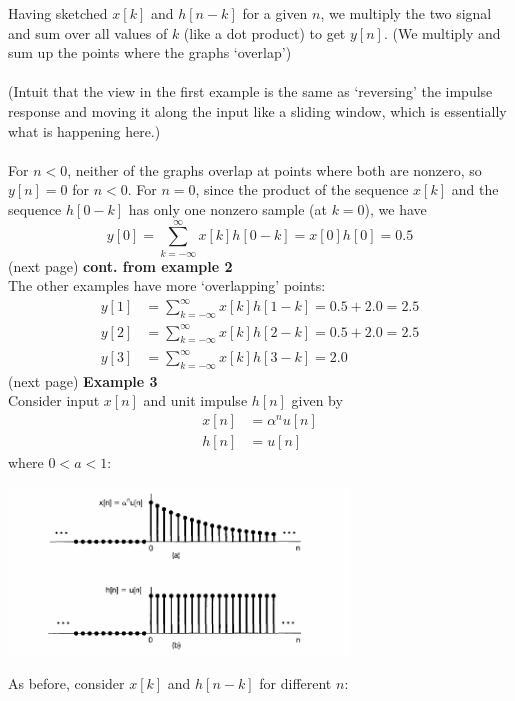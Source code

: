 \documentclass{report}
\begin{document}
Having sketched $x[k]$ and $h[n-k]$ for a given $n$, we multiply the two signal and sum over all values of $k$ 
(like a dot product) to get $y[n]$. (We multiply and sum up the points where the graphs `overlap')\\
\vspace{1mm}\\
(Intuit that the view in the first example is the same as `reversing' the impulse response and moving it along the input like a 
sliding window, which is essentially what is happening here.)\\
\vspace{1mm}\\
For $n<0$, neither of the graphs overlap at points where both are nonzero, so $y[n]=0$ for $n<0$. For $n=0$, since the product
of the sequence $x[k]$ and the sequence $h[0-k]$ has only one nonzero sample (at $k=0$), we have
\begin{equation*}
y[0]=\sum^\infty_{k=-\infty}x[k]h[0-k]=x[0]h[0]=0.5
\end{equation*}
(next page)\newpage
\noindent\textbf{cont. from example 2}\\
The other examples have more `overlapping' points:
\begin{align*}
y[1]&=\sum^\infty_{k=-\infty}x[k]h[1-k]=0.5+2.0=2.5\\
y[2]&=\sum^\infty_{k=-\infty}x[k]h[2-k]=0.5+2.0=2.5\\
y[3]&=\sum^\infty_{k=-\infty}x[k]h[3-k]=2.0
\end{align*}
(next page)\newpage
\noindent\textbf{Example 3}\\
Consider input $x[n]$ and unit impulse $h[n]$ given by
\begin{align*}
x[n]&=\alpha^nu[n]\\
h[n]&=u[n]
\end{align*}
where $0<a<1$:
\begin{center}
\includegraphics[width=9cm]{a23}\\
\end{center}
As before, consider $x[k]$ and $h[n-k]$ for different $n$:
\end{document}
